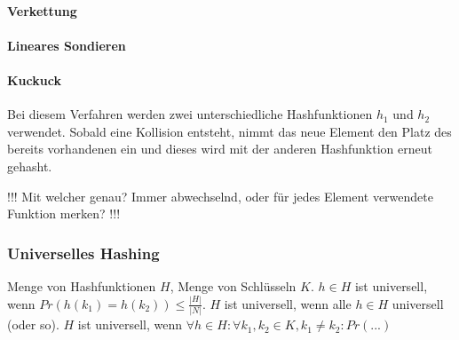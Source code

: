 \paragraph{Verkettung}
\paragraph{Lineares Sondieren}
\paragraph{Kuckuck} Bei diesem Verfahren werden zwei unterschiedliche Hashfunktionen $h_1$ und $h_2$ verwendet.
Sobald eine Kollision entsteht, nimmt das neue Element den Platz des bereits vorhandenen ein und dieses wird mit der anderen Hashfunktion erneut gehasht.

!!! Mit welcher genau? Immer abwechselnd, oder für jedes Element verwendete Funktion merken? !!!

\subsubsection{Universelles Hashing}
Menge von Hashfunktionen $H$, Menge von Schlüsseln $K$.
$h \in H$ ist universell, wenn $Pr(h(k_1) = h(k_2)) \leq \frac{|H|}{|N|}$.
$H$ ist universell, wenn alle $h \in H$ universell (oder so).
$H$ ist universell, wenn $\forall h \in H: \forall k_1, k_2 \in K, k_1 \neq k_2: Pr(...)$
